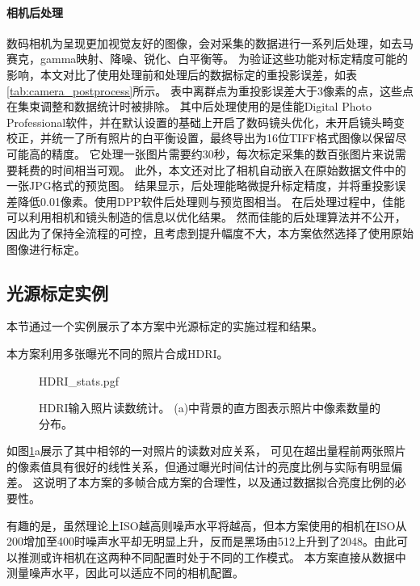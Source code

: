 \paragraph{相机后处理}
数码相机为呈现更加视觉友好的图像，会对采集的数据进行一系列后处理，如去马赛克，gamma映射、降噪、锐化、白平衡等。
为验证这些功能对标定精度可能的影响，本文对比了使用处理前和处理后的数据标定的重投影误差，如表\ref{tab:camera_postprocess}所示。
表中离群点为重投影误差大于3像素的点，这些点在集束调整和数据统计时被排除。
其中后处理使用的是佳能Digital Photo Professional软件，并在默认设置的基础上开启了数码镜头优化，未开启镜头畸变校正，并统一了所有照片的白平衡设置，最终导出为16位TIFF格式图像以保留尽可能高的精度。
它处理一张图片需要约30秒，每次标定采集的数百张图片来说需要耗费的时间相当可观。
此外，本文还对比了相机自动嵌入在原始数据文件中的一张JPG格式的预览图。
结果显示，后处理能略微提升标定精度，并将重投影误差降低0.01像素。使用DPP软件后处理则与预览图相当。
在后处理过程中，佳能可以利用相机和镜头制造的信息以优化结果。
然而佳能的后处理算法并不公开，因此为了保持全流程的可控，且考虑到提升幅度不大，本方案依然选择了使用原始图像进行标定。

\subsection{光源标定实例}

本节通过一个实例展示了本方案中光源标定的实施过程和结果。

本方案利用多张曝光不同的照片合成HDRI。
\begin{figure}[tbh]
    \centering
    {HDRI_stats.pgf}
    \caption[HDRI输入照片读数统计]{HDRI输入照片读数统计。
    (a)中背景的直方图表示照片中像素数量的分布。
    }
    \label{fig:HDRI_stat}
\end{figure}
如图\ref{fig:HDRI_stat}a展示了其中相邻的一对照片的读数对应关系，
可见在超出量程前两张照片的像素值具有很好的线性关系，但通过曝光时间估计的亮度比例与实际有明显偏差。
这说明了本方案的多帧合成方案的合理性，以及通过数据拟合亮度比例的必要性。

有趣的是，虽然理论上ISO越高则噪声水平将越高，但本方案使用的相机在ISO从200增加至400时噪声水平却无明显上升，反而是黑场由512上升到了2048。由此可以推测或许相机在这两种不同配置时处于不同的工作模式。
本方案直接从数据中测量噪声水平，因此可以适应不同的相机配置。

